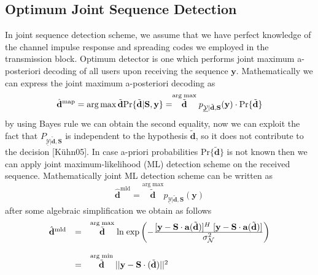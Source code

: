 \subsection{Optimum Joint Sequence Detection}
In joint sequence detection scheme, we assume that we have perfect knowledge of the channel impulse response and spreading codes we employed in the transmission block. Optimum detector is one which performs joint maximum a-posteriori decoding of all users upon receiving the sequence $\mathrm{\mathbf{y}}$. Mathematically we can express the joint maximum a-posteriori decoding as
\begin{equation}
\mathrm{\hat{\mathbf{d}}^{map}}=\mathop{\mathrm{arg\,max}}{\mathrm{\tilde{\mathbf{d}}}} \mathrm{Pr}\{\mathrm{\tilde{\mathbf{d}}}\vert \mathrm{\mathbf{S}},\mathrm{\mathbf{y}}\} = \stackrel{\mathrm{arg\;max}}{\mathrm{\tilde{\mathbf{d}}}} p_{\underline{\mathcal{Y}}\vert\mathrm{\tilde{\mathbf{d}}},\mathrm{\mathbf{S}}}(\mathrm{\mathbf{y}})\cdot \mathrm{Pr}\{\mathrm{\tilde{\mathbf{d}}}\}
\end{equation}
by using Bayes rule we can obtain the second equality, now we can exploit the fact that $P_{\underline{\mathcal{Y}}\vert \mathrm{\tilde{\mathbf{d}}},\mathrm{\mathbf{S}}}$ is independent to the hypothesis $\mathrm{\tilde{\mathbf{d}}}$, so it does not contribute to the decision [K\"uhn05]. In case a-priori probabilities $\mathrm{Pr\{\tilde{\mathbf{d}}\}}$ is not known then we can apply joint maximum-likelihood (ML) detection scheme on the received sequence. Mathematically joint ML detection scheme can be written as
\begin{equation}
\mathrm{\hat{\mathbf{d}}^{mld}}=\stackrel{\mathrm{arg\;max}}{\mathrm{\tilde{\mathbf{d}}}}p_{\underline{\mathcal{Y}}\vert\mathrm{\tilde{\mathbf{d}}},\mathrm{\mathbf{S}}}(\mathrm{\mathbf{y}})
\end{equation}
after some algebraic simplification we obtain as follows
\begin{eqnarray}
\begin{array}{lll}
\mathrm{\hat{\mathbf{d}}^{mld}}&=&\stackrel{\mathrm{arg\;max}}{\mathrm{\tilde{\mathbf{d}}}} \mathrm{ln\;exp}\left(-\frac{\hbox{$[\mathrm{\mathbf{y}}-\mathrm{\mathbf{S}}\cdot \mathrm{\mathbf{a}}(\mathrm{\tilde{\mathbf{d}}})]^{H}\;[\mathrm{\mathbf{y}}-\mathrm{\mathbf{S}}\cdot \mathrm{\mathbf{a}}(\mathrm{\tilde{\mathbf{d}}})]$}} {\hbox{$\sigma^2_{\mathcal{N}}$}}\right) \\ \\

&=&\stackrel{\mathrm{arg\;min}}{\mathrm{\tilde{\mathbf{d}}}}\vert \vert \mathrm{\mathbf{y}}-\mathrm{\mathbf{S}}\cdot\mathrm{(\tilde{\mathbf{d}})}\vert\vert^2
\end{array}
\end{eqnarray}
